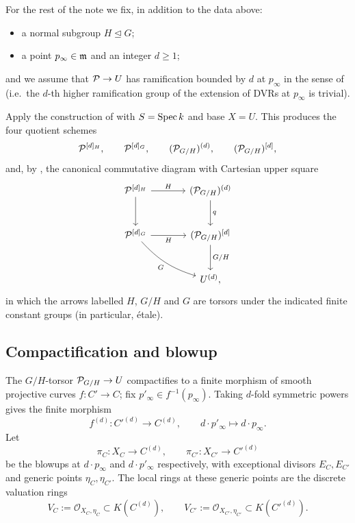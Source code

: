 \documentclass[11pt]{article}
\begin{document}
For the rest of the note we fix, in addition to the data above:
\begin{itemize}
  \item a normal subgroup $H \trianglelefteq G$;
  \item a point $p_\infty \in \mathfrak{m}$ and an integer $d \geq 1$;
\end{itemize}
and we assume that $\mathcal{P} \to U$ has ramification bounded by $d$ at $p_\infty$ in
the sense of  (i.e.\ the $d$-th
higher ramification group of the extension of DVRs at $p_\infty$ is trivial).

Apply the construction of  with
$S = \operatorname{Spec} k$ and base $X = U$.  This produces the four quotient schemes
\[
\mathcal{P}^{[d]_H},\qquad \mathcal{P}^{[d]_G},\qquad (\mathcal{P}_{G/H})^{(d)},\qquad (\mathcal{P}_{G/H})^{[d]},
\]
and, by , the canonical commutative diagram with
Cartesian upper square
\[
\begin{tikzcd}[row sep=large, column sep=large]
\cP^{[d]_H} \ar[r,"H"] \ar[d]
  & (\cP_{G/H})^{(d)} \ar[d,"q"] \\
\cP^{[d]_G} \ar[r,"H"'] \ar[dr,"G"',bend right=15]
  & (\cP_{G/H})^{[d]} \ar[d,"G/H"] \\
  & U^{(d)},
\end{tikzcd}
\]
in which the arrows labelled $H$, $G/H$ and $G$ are torsors under the indicated
finite constant groups (in particular, \'etale).

\subsection{Compactification and blowup}\label{subsec:compactify-blowup}

The $G/H$-torsor $\mathcal{P}_{G/H} \to U$ compactifies to a finite morphism of smooth
projective curves $f \colon C' \to C$; fix $p'_\infty \in f^{-1}(p_\infty)$.
Taking $d$-fold symmetric powers gives the finite morphism
\[
f^{(d)} \colon C'^{(d)} \to C^{(d)}, \qquad d \cdot p'_\infty \longmapsto d \cdot p_\infty .
\]
Let
\[
\pi_C \colon X_C \to C^{(d)},\qquad \pi_{C'} \colon X_{C'} \to C'^{(d)}
\]
be the blowups at $d \cdot p_\infty$ and $d \cdot p'_\infty$ respectively, with
exceptional divisors $E_C, E_{C'}$ and generic points $\eta_C, \eta_{C'}$.  The
local rings at these generic points are the discrete valuation rings
\[
V_C := \mathcal{O}_{X_C,\eta_C} \subset K(C^{(d)}),\qquad
V_{C'} := \mathcal{O}_{X_{C'},\eta_{C'}} \subset K(C'^{(d)}).
\]
\end{document}
